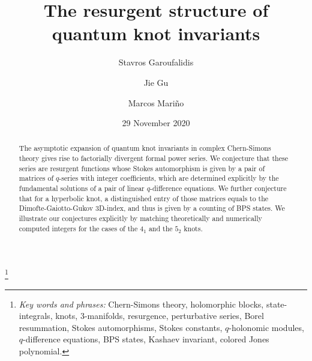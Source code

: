 \documentclass[12pt,reqno]{amsart}
\theoremstyle{definition}
\begin{document}
\title[The resurgent structure of quantum knot invariants]{The
  resurgent structure of quantum knot invariants}
\author{Stavros Garoufalidis}
\address{%
  International Center for Mathematics, Department of Mathematics \\
  Southern University of Science and Technology \\
  Shenzhen, China \newline
  {\tt \url{http://people.mpim-bonn.mpg.de/stavros}}}
\author{Jie Gu}
\address{D\'epartement de Physique Th\'eorique, Universit\'e de Gen\`eve \\
Universit\'e de Gen\`eve, 1211 Gen\`eve 4, Switzerland}
\author{Marcos Mari\~no}
\address{Section de Math\'ematiques et D\'epartement de Physique Th\'eorique\\
Universit\'e de Gen\`eve, 1211 Gen\`eve 4, Switzerland }


\thanks{
{\em Key words and phrases:}
Chern-Simons theory, holomorphic blocks, state-integrals, knots,
3-manifolds, resurgence, perturbative series, Borel resummation,
Stokes automorphisms, Stokes constants, $q$-holonomic modules,
$q$-difference equations, BPS states, Kashaev invariant,
colored Jones polynomial.
}

\date{29 November 2020}%

\begin{abstract}
  The asymptotic expansion of quantum knot invariants in complex
  Chern-Simons theory gives rise to factorially divergent formal power
  series. We conjecture that these series are resurgent functions
  whose Stokes automorphism is given by a pair of matrices of
  $q$-series with integer coefficients, which are determined
  explicitly by the fundamental solutions of a pair of linear
  $q$-difference equations. We further conjecture that for a
  hyperbolic knot, a distinguished entry of those matrices equals to
  the Dimofte-Gaiotto-Gukov 3D-index, and thus is given by a counting
  of BPS states. We illustrate our conjectures explicitly by matching
  theoretically and numerically computed integers for the cases of the
  $4_1$ and the $5_2$ knots.
\end{abstract}
\end{document}
